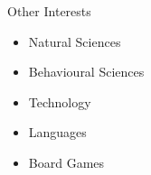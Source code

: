 %

\begin{rSection}{Other Interests}
    \begin{itemize}
        \item Natural Sciences
        \item Behavioural Sciences
        \item Technology
        \item Languages
        \item Board Games
    \end{itemize}
\end{rSection}
